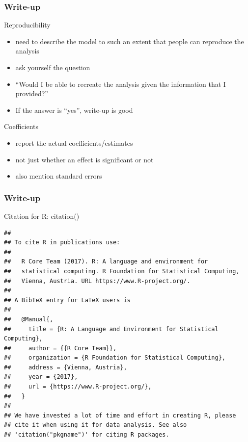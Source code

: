\documentclass[10p]{beamer}\usepackage[]{graphicx}\usepackage[]{color}
\makeatletter
\newenvironment{kframe}{%
 \def\at@end@of@kframe{}%
 \ifinner\ifhmode%
  \def\at@end@of@kframe{\end{minipage}}%
  \begin{minipage}{\columnwidth}%
 \fi\fi%
 \def\FrameCommand##1{\hskip\@totalleftmargin \hskip-\fboxsep
 \colorbox{shadecolor}{##1}\hskip-\fboxsep
     \hskip-\linewidth \hskip-\@totalleftmargin \hskip\columnwidth}%
 \MakeFramed {\advance\hsize-\width
   \@totalleftmargin\z@ \linewidth\hsize
   \@setminipage}}%
 {\par\unskip\endMakeFramed%
 \at@end@of@kframe}
\newenvironment{knitrout}{}{} %
\makeatother
\begin{document}
\begin{frame}
\frametitle{Write-up}
Reproducibility
\begin{itemize}
\item need to describe the model to such an extent that people can reproduce the analysis
\item ask yourself the question
\item ``Would I be able to recreate the analysis given the information that I provided?''
\item If the answer is ``yes'', write-up is good
\end{itemize}

Coefficients
\begin{itemize}
\item report the actual coefficients/estimates
\item not just whether an effect is significant or not
\item also mention standard errors
\end{itemize}
\end{frame}

\begin{frame}[fragile]
\frametitle{Write-up}
Citation for R: citation()
\begin{knitrout}\scriptsize
{}\color{fgcolor}\begin{kframe}
\begin{verbatim}
## 
## To cite R in publications use:
## 
##   R Core Team (2017). R: A language and environment for
##   statistical computing. R Foundation for Statistical Computing,
##   Vienna, Austria. URL https://www.R-project.org/.
## 
## A BibTeX entry for LaTeX users is
## 
##   @Manual{,
##     title = {R: A Language and Environment for Statistical Computing},
##     author = {{R Core Team}},
##     organization = {R Foundation for Statistical Computing},
##     address = {Vienna, Austria},
##     year = {2017},
##     url = {https://www.R-project.org/},
##   }
## 
## We have invested a lot of time and effort in creating R, please
## cite it when using it for data analysis. See also
## 'citation("pkgname")' for citing R packages.
\end{verbatim}
\end{kframe}
\end{knitrout}
\end{frame}
\end{document}
